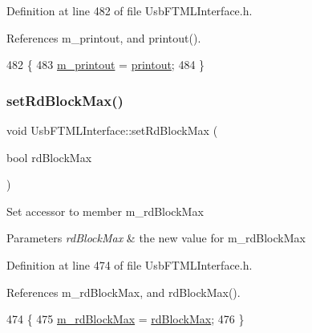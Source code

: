 Definition at line 482 of file Usb\+F\+T\+M\+L\+Interface.\+h.



References m\+\_\+printout, and printout().


\begin{DoxyCode}
482                                    \{
483     \hyperlink{classUsbFTMLInterface_a57b909e50c9eba8ffbcb66e0d9649632}{m\_printout} = \hyperlink{classUsbFTMLInterface_a1045e3851406cf07e31c498d0de230e1}{printout};
484   \}
\end{DoxyCode}
\mbox{\label{classUsbFTMLInterface_abdd0b79fb1d8a17c6a97969a291b858b}} 
\subsubsection{\texorpdfstring{set\+Rd\+Block\+Max()}{setRdBlockMax()}}
{\footnotesize\ttfamily void Usb\+F\+T\+M\+L\+Interface\+::set\+Rd\+Block\+Max (\begin{DoxyParamCaption}\item[{bool}]{rd\+Block\+Max }\end{DoxyParamCaption})\hspace{0.3cm}{\ttfamily [inline]}}

Set accessor to member m\+\_\+rd\+Block\+Max 
\begin{DoxyParams}{Parameters}
{\em rd\+Block\+Max} & the new value for m\+\_\+rd\+Block\+Max \\
\hline
\end{DoxyParams}


Definition at line 474 of file Usb\+F\+T\+M\+L\+Interface.\+h.



References m\+\_\+rd\+Block\+Max, and rd\+Block\+Max().


\begin{DoxyCode}
474                                        \{
475     \hyperlink{classUsbFTMLInterface_af950506bbfb1e198af7ea2141058d018}{m\_rdBlockMax} = \hyperlink{classUsbFTMLInterface_ac0a393da12305baa111deb699f7190cb}{rdBlockMax};
476   \}
\end{DoxyCode}
\mbox{\label{classUsbFTMLInterface_a53fda4d42c82362f61544ba7c05beb8a}} 

